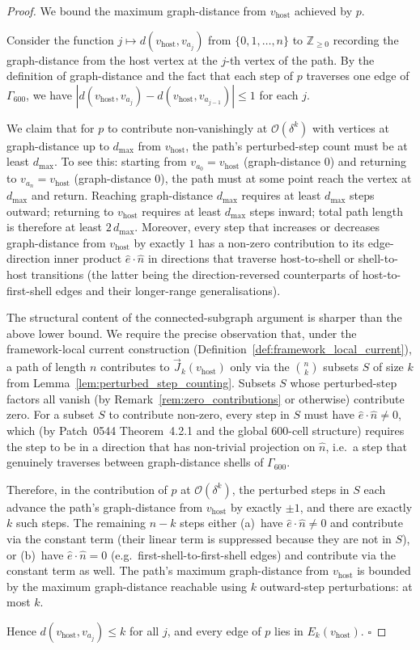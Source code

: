 \documentclass[11pt,letterpaper]{article}
\newcommand{\nhat}{\hat{n}}
\newcommand{\vhost}{v_{\text{host}}}
\newcommand{\Eorder}[1]{\mathcal{O}(\delta^{#1})}
\newcommand{\Gsixcell}{\Gamma_{600}}
\begin{document}
\begin{proof}
We bound the maximum graph-distance from $\vhost$ achieved by $p$.

Consider the function $j \mapsto d(\vhost, v_{a_j})$ from $\{0, 1, \ldots, n\}$ to $\mathbb{Z}_{\geq 0}$ recording the graph-distance from the host vertex at the $j$-th vertex of the path. By the definition of graph-distance and the fact that each step of $p$ traverses one edge of $\Gsixcell$, we have $|d(\vhost, v_{a_j}) - d(\vhost, v_{a_{j-1}})| \leq 1$ for each $j$.

We claim that for $p$ to contribute non-vanishingly at $\Eorder{k}$ with vertices at graph-distance up to $d_{\max}$ from $\vhost$, the path's perturbed-step count must be at least $d_{\max}$. To see this: starting from $v_{a_0} = \vhost$ (graph-distance 0) and returning to $v_{a_n} = \vhost$ (graph-distance 0), the path must at some point reach the vertex at $d_{\max}$ and return. Reaching graph-distance $d_{\max}$ requires at least $d_{\max}$ steps outward; returning to $\vhost$ requires at least $d_{\max}$ steps inward; total path length is therefore at least $2\,d_{\max}$. Moreover, every step that increases or decreases graph-distance from $\vhost$ by exactly $1$ has a non-zero contribution to its edge-direction inner product $\hat{e}\cdot\nhat$ in directions that traverse host-to-shell or shell-to-host transitions (the latter being the direction-reversed counterparts of host-to-first-shell edges and their longer-range generalisations).

The structural content of the connected-subgraph argument is sharper than the above lower bound. We require the precise observation that, under the framework-local current construction (Definition~\ref{def:framework_local_current}), a path of length $n$ contributes to $\vec{J}_k(\vhost)$ only via the $\binom{n}{k}$ subsets $S$ of size $k$ from Lemma~\ref{lem:perturbed_step_counting}. Subsets $S$ whose perturbed-step factors all vanish (by Remark~\ref{rem:zero_contributions} or otherwise) contribute zero. For a subset $S$ to contribute non-zero, every step in $S$ must have $\hat{e}\cdot\nhat \neq 0$, which (by Patch~0544 Theorem~4.2.1 and the global 600-cell structure) requires the step to be in a direction that has non-trivial projection on $\nhat$, i.e.\ a step that genuinely traverses between graph-distance shells of $\Gsixcell$.

Therefore, in the contribution of $p$ at $\Eorder{k}$, the perturbed steps in $S$ each advance the path's graph-distance from $\vhost$ by exactly $\pm 1$, and there are exactly $k$ such steps. The remaining $n - k$ steps either (a)~have $\hat{e}\cdot\nhat \neq 0$ and contribute via the constant term (their linear term is suppressed because they are not in $S$), or (b)~have $\hat{e}\cdot\nhat = 0$ (e.g.\ first-shell-to-first-shell edges) and contribute via the constant term as well. The path's maximum graph-distance from $\vhost$ is bounded by the maximum graph-distance reachable using $k$ outward-step perturbations: at most $k$.

Hence $d(\vhost, v_{a_j}) \leq k$ for all $j$, and every edge of $p$ lies in $E_k(\vhost)$. $\square$
\end{proof}
\end{document}
